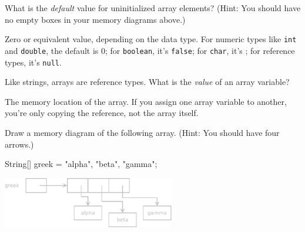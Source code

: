 \Q What is the \emph{default} value for uninitialized array elements?
(Hint: You should have no empty boxes in your memory diagrams above.)

\begin{answer}
Zero or equivalent value, depending on the data type.
For numeric types like {\tt int} and {\tt double}, the default is 0; for {\tt boolean}, it's {\tt false}; for {\tt char}, it's {\tt {}\qs}; for reference types, it's {\tt null}.
\end{answer}


\Q Like strings, arrays are reference types. What is the \emph{value} of an array variable?

\begin{answer}
The memory location of the array. If you assign one array variable to another, you're only copying the reference, not the array itself.
\end{answer}


\Q Draw a memory diagram of the following array.
(Hint: You should have four arrows.)

\begin{javalst}
String[] greek = {"alpha", "beta", "gamma"};
\end{javalst}

\begin{answer}[5em]
\hspace{4em}
\includegraphics[height=6em]{string-array.pdf}
\end{answer}
